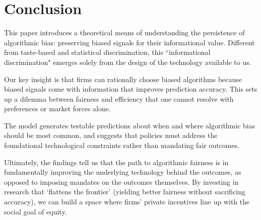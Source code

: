 \section{Conclusion}

This paper introduces a theoretical means of understanding the persistence of algorithmic bias: preserving biased signals for their informational value. Different from taste-based and statistical discrimination, this ``informational discrimination" emerges solely from the design of the technology available to us.

Our key insight is that firms can rationally choose biased algorithms because biased signals come with information that improves prediction accuracy. This sets up a dilemma between fairness and efficiency that one cannot resolve with preferences or market forces alone.

The model generates testable predictions about when and where algorithmic bias should be most common, and suggests that policies must address the foundational technological constraints rather than mandating fair outcomes.

Ultimately, the findings tell us that the path to algorithmic fairness is in fundamentally improving the underlying technology behind the outcomes, as opposed to imposing mandates on the outcomes themselves. By investing in research that `flattens the frontier' (yielding better fairness without sacrificing accuracy), we can build a space where firms' private incentives line up with the social goal of equity.